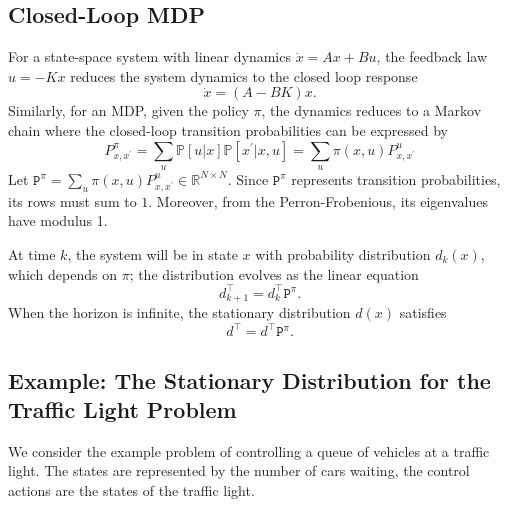\subsection{Closed-Loop MDP}

For a state-space system with linear dynamics $\dot{x} = Ax+Bu$, the feedback law $u=-Kx$ reduces the system dynamics to the closed loop response
\begin{equation*}
  \dot{x} = (A-BK)x.
\end{equation*}
Similarly, for an MDP, given the policy $\pi$, the dynamics reduces to a Markov chain where the closed-loop transition probabilities can be expressed by
\begin{equation*}
  P^\pi _{x,x^\prime} = \sum_u \mathbb{P}[u|x] \mathbb{P}[x^\prime|x,u] = \sum_u \pi(x,u) P_{x,x^\prime}^u
\end{equation*}
Let $\mathtt{P}^\pi = \sum_u \pi(x,u) P_{x,x^\prime}^u\in \mathbb{R}^{N\times N}$. Since $\mathtt{P}^\pi$ represents transition probabilities, its rows must sum to $1$. Moreover, from the Perron-Frobenious, its eigenvalues have modulus 1.

At time $k$, the system will be in state $x$ with probability distribution $d_k(x)$, which depends on $\pi$; the distribution evolves as the linear equation
\begin{equation*}
  d_{k+1}^\top = d_k^\top \mathtt{P}^\pi.
\end{equation*}
When the horizon is infinite, the stationary distribution $d(x)$ satisfies
\begin{equation*}
  d^\top = d^\top \mathtt{P}^\pi.
\end{equation*}


\subsection{Example: The Stationary Distribution for the Traffic Light Problem}

We consider the  example problem of controlling a queue of vehicles at a traffic light. The states are represented by the number of cars waiting, the control actions are the states of the traffic light.

